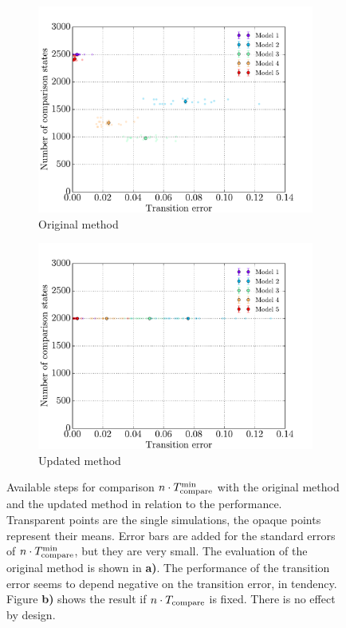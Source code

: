 \begin{figure}[!b]
    \centering
    \begin{subfigure}{0.48\textwidth}
    	\centering
        \includegraphics[width=\textwidth]{results/mc1_ncomparison_distances_old}
        \caption{Original method}
        \label{fig:mc1-comparison-old}
    \end{subfigure}
    \hfill
    \begin{subfigure}{0.48\textwidth}
    	\centering
        \includegraphics[width=\textwidth]{results/mc1_ncomparison_distances_new}
        \caption{Updated method}
        \label{fig:mc1-comparison-new}
    \end{subfigure}
    \caption[Available steps for comparison]{Available steps for comparison $n\cdot T_{\text{compare}}^{\text{min}}$ with the original method and the updated method in relation to the performance. Transparent points are the single simulations, the opaque points represent their means. Error bars are added for the standard errors of $n\cdot T_{\text{compare}}^{\text{min}}$, but they are very small. The evaluation of the original method is shown in \textbf{a)}. The performance of the transition error seems to depend negative on the transition error, in tendency. Figure \textbf{b)} shows the result if $n\cdot T_{\text{compare}}$ is fixed. There is no effect by design.}
    \label{fig:mc1-comparison}
\end{figure}

